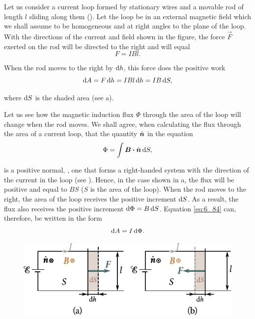 Let us consider a current loop formed by stationary wires and a movable rod of length $l$ sliding along them (). Let the loop be in an external magnetic field which we shall assume to be homogeneous and at right angles to the plane of the loop. With the directions of the current and field shown in the figure, the force $\vec{F}$ exerted on the rod will be directed to the right and will equal
\begin{equation*}
    F = I B l.
\end{equation*}

\noindent
When the rod moves to the right by $\mathrm{d} h$, this force does the positive work
\begin{equation}\label{eq:6_84}
    \mathrm{d} A = F\, \mathrm{d} h = I B l\, \mathrm{d} h = I B\, \mathrm{d} S,
\end{equation}

\noindent
where $\mathrm{d} S$ is the shaded area (see a).

Let us see how the magnetic induction flux $\Phi$ through the area of the loop will change when the rod moves. We shall agree, when calculating the flux through the area of a current loop, that the quantity $\hat{\boldsymbol{n}}$ in the equation
\begin{equation*}
    \Phi = \int \boldsymbol{B} \boldsymbol{\cdot} \hat{\boldsymbol{n}}\, \mathrm{d} S,
\end{equation*}

\noindent
is a positive normal, \ie, one that forms a right-handed system with the direction of the current in the loop (see ). Hence, in the case shown in a, the flux will be positive and equal to $BS$ ($S$ is the area of the loop). When the rod moves to the right, the area of the loop receives the positive increment $\mathrm{d} S$. As a result, the flux also receives the positive increment $\mathrm{d}\Phi=B\,\mathrm{d} S$. Equation \eqref{eq:6_84} can, therefore, be written in the form
\begin{equation}\label{eq:6_85}
    \mathrm{d} A = I\, \mathrm{d}\Phi.
\end{equation}

\begin{figure}[t]
	\begin{center}
		\includegraphics[scale=1.1]{figures/ch_06/fig_6_21.pdf}
		\caption[]{}
		\label{fig:6_21}
	\end{center}
	\vspace{-0.8cm}
\end{figure}

